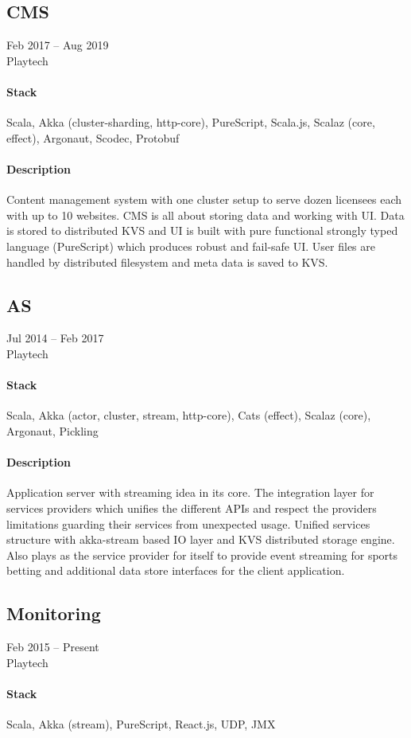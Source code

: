 \subsection{CMS}
Feb 2017 – Aug 2019\\Playtech
\paragraph{Stack} Scala, Akka (cluster-sharding, http-core), PureScript, Scala.js, Scalaz (core, effect), Argonaut, Scodec, Protobuf
\paragraph{Description}
Content management system with one cluster setup to serve dozen licensees each with up to 10 websites. CMS is all about storing data and working with UI. Data is stored to distributed KVS and UI is built with pure functional strongly typed language (PureScript) which produces robust and fail-safe UI. User files are handled by distributed filesystem and meta data is saved to KVS.
\subsection{AS}
Jul 2014 – Feb 2017\\Playtech
\paragraph{Stack} Scala, Akka (actor, cluster, stream, http-core), Cats (effect), Scalaz (core), Argonaut, Pickling
\paragraph{Description}
Application server with streaming idea in its core. The integration layer for services providers which unifies the different APIs and respect the providers limitations guarding their services from unexpected usage. Unified services structure with akka-stream based IO layer and KVS distributed storage engine. Also plays as the service provider for itself to provide event streaming for sports betting and additional data store interfaces for the client application.
\subsection{Monitoring}
Feb 2015 – Present\\Playtech
\paragraph{Stack} Scala, Akka (stream), PureScript, React.js, UDP, JMX
